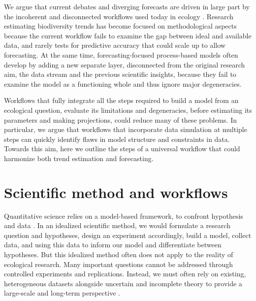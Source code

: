 \documentclass[11pt]{article}
\begin{document}

We argue that current debates and diverging forecasts are driven in large part by the incoherent and disconnected workflows used today in ecology \citep{Loreau2022, Talis2023, Johnson2024}. Research estimating biodiversity trends has become focused on methodological aspects because the current workflow fails to examine the gap between ideal and available data, and rarely tests for predictive accuracy that could scale up to allow forecasting. At the same time, forecasting-focused process-based models often develop by adding a new separate layer, disconnected from the original research aim, the data stream and the previous scientific insights, because they fail to examine the model as a functioning whole and thus ignore major degeneracies. 

Workflows that fully integrate all the steps required to build a model from an ecological question, evaluate its limitations and degeneracies, before estimating its parameters and making projections, could reduce many of these problems. In particular, we argue that workflows that incorporate data simulation at multiple steps can quickly identify flaws in model structure and constraints in data. Towards this aim, here we outline the steps of a universal workflow that could harmonize both trend estimation and forecasting. %

\section{Scientific method and workflows}

Quantitative science relies on a model-based framework, to confront hypothesis and data \citep{}. In an idealized scientific method, we would formulate a research question and hypotheses, design an experiment accordingly, build a model, collect data, and using this data to inform our model and differentiate between hypotheses. But this idealized method often does not apply to the reality of ecological research. Many important questions cannot be addressed through controlled experiments and replications. Instead, we must often rely on existing, heterogeneous datasets alongside uncertain and incomplete theory to provide a large-scale and long-term perspective \citep{Hilborn1997}.
\end{document}
